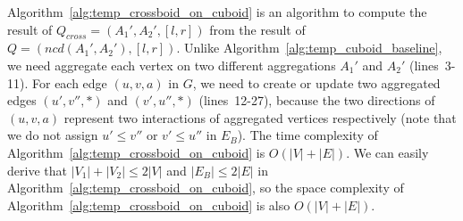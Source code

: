 \documentclass[10pt,journal,compsoc]{IEEEtran}
\begin{document}
Algorithm~\ref{alg:temp_crossboid_on_cuboid} is an algorithm to compute the result of $ Q_{cross}=(A_1',A_2',[l,r]) $ from the result of $ Q=(ncd(A_1',A_2'),[l,r]) $. Unlike Algorithm~\ref{alg:temp_cuboid_baseline}, we need aggregate each vertex on two different aggregations $ A_1' $ and $ A_2' $ (lines~3-11). For each edge $ (u,v,a) $ in $ G $, we need to create or update two aggregated edges $ (u',v'',\ast) $ and $ (v',u'',\ast) $ (lines~12-27), because the two directions of $ (u,v,a) $ represent two interactions of aggregated vertices respectively (note that we do not assign $ u' \leq v'' $ or $ v' \leq u'' $ in $ E_B $). The time complexity of Algorithm~\ref{alg:temp_crossboid_on_cuboid} is $ O(|V|+|E|) $. We can easily derive that $ |V_1|+|V_2| \leq 2|V| $ and $ |E_B| \leq 2|E| $ in Algorithm~\ref{alg:temp_crossboid_on_cuboid}, so the space complexity of Algorithm~\ref{alg:temp_crossboid_on_cuboid} is also $ O(|V|+|E|) $.
\end{document}
